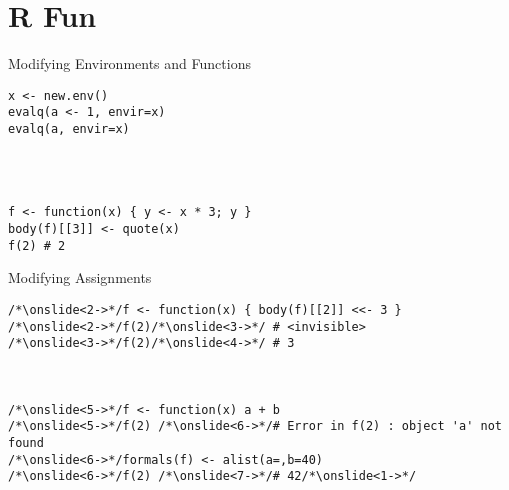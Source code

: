 \section{R Fun}
\begin{frame}[fragile,c]{Modifying Environments and Functions}
%
\begin{verbatim}
x <- new.env()
evalq(a <- 1, envir=x)
evalq(a, envir=x)




f <- function(x) { y <- x * 3; y }
body(f)[[3]] <- quote(x)
f(2) # 2
\end{verbatim}
\end{frame}

\begin{frame}[fragile,c]{Modifying Assignments}
%
\begin{verbatim}
/*\onslide<2->*/f <- function(x) { body(f)[[2]] <<- 3 }
/*\onslide<2->*/f(2)/*\onslide<3->*/ # <invisible>
/*\onslide<3->*/f(2)/*\onslide<4->*/ # 3



/*\onslide<5->*/f <- function(x) a + b
/*\onslide<5->*/f(2) /*\onslide<6->*/# Error in f(2) : object 'a' not found
/*\onslide<6->*/formals(f) <- alist(a=,b=40)
/*\onslide<6->*/f(2) /*\onslide<7->*/# 42/*\onslide<1->*/
\end{verbatim}
\end{frame}